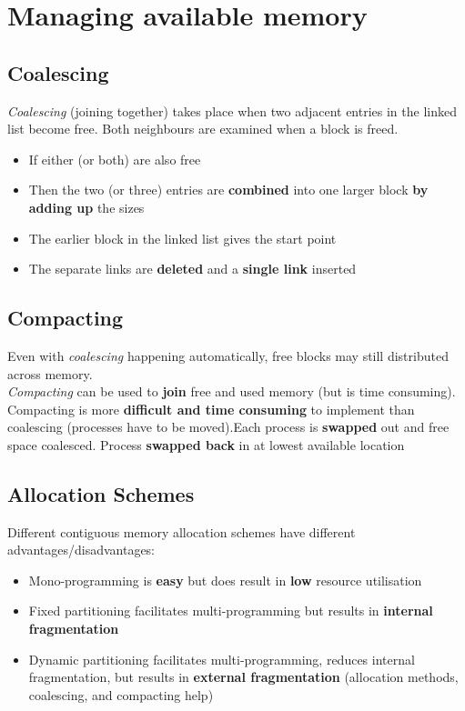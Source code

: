 \documentclass{article}
\begin{document}
\section{Managing available memory}
\subsection{Coalescing}
\begin{flushleft}
\textit{Coalescing} (joining together) takes place when two adjacent entries in the linked list become free. Both neighbours are examined when a block is freed.
\begin{itemize}
	\item If either (or both) are also free
	\item Then the two (or three) entries are \textbf{combined} into one larger block \textbf{by adding up} the sizes
	\item The earlier block in the linked list gives the start point
	\item The separate links are \textbf{deleted} and a \textbf{single link} inserted
\end{itemize}
\end{flushleft}

\subsection{Compacting}
\begin{flushleft}
Even with \textit{coalescing} happening automatically, free blocks may still distributed across memory.\\
\textit{Compacting} can be used to \textbf{join} free and used memory (but is time consuming). Compacting is more \textbf{difficult and time consuming} to implement than coalescing (processes have to be moved).Each process is \textbf{swapped} out and free space coalesced. Process \textbf{swapped back} in at lowest available location
\end{flushleft}

\subsection{Allocation Schemes}
\begin{flushleft}
Different contiguous memory allocation schemes have different advantages/disadvantages:
\begin{itemize}
	\item Mono-programming is \textbf{easy} but does result in \textbf{low} resource utilisation
	\item Fixed partitioning facilitates multi-programming but results in \textbf{internal fragmentation}
	\item Dynamic partitioning facilitates multi-programming, reduces internal fragmentation, but results in \textbf{external fragmentation} (allocation methods, coalescing, and compacting help) 
\end{itemize}
\end{flushleft}
\end{document}
